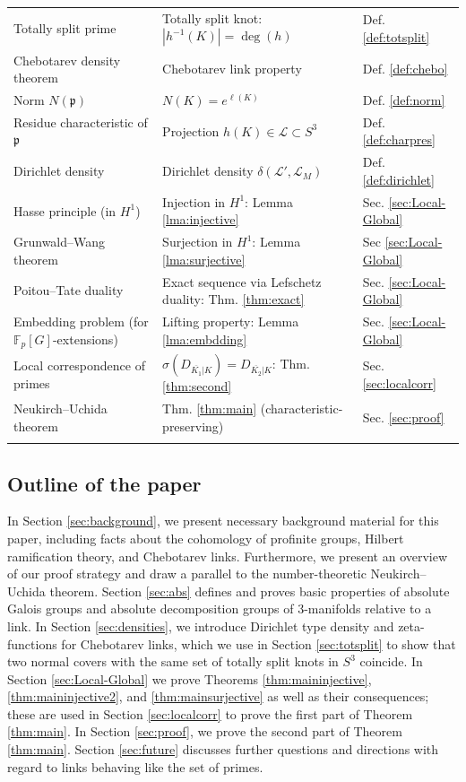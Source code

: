 \documentclass{amsart}
\theoremstyle{plain}
\theoremstyle{definition}
\theoremstyle{plain}
\theoremstyle{plain}
\theoremstyle{plain}
\theoremstyle{remark}
\theoremstyle{remark}
\theoremstyle{plain}
\theoremstyle{definition}
\theoremstyle{plain}
\newcounter{main}
\theoremstyle{plain}
\theoremstyle{plain}
\numberwithin{equation}{section}
\begin{document}
{\begin{longtable}{@{} l l l @{}}
\midrule
Totally split prime & Totally split knot: $|h^{-1}(K)| = \deg(h)$ & Def. \ref{def:totsplit} \\
Chebotarev density theorem & Chebotarev link property & Def. \ref{def:chebo} \\
Norm $N(\mathfrak{p})$ & $N(K) = e^{\ell(K)}$ & Def. \ref{def:norm} \\
Residue characteristic of $\mathfrak{p}$ & Projection $h(K) \in \mathcal{L} \subset S^3$ & Def. \ref{def:charpres} \\
Dirichlet density & Dirichlet density $\delta(\mathcal{L}', \mathcal{L}_M)$ & Def. \ref{def:dirichlet} \\
\midrule
Hasse principle (in $H^1$) & Injection in $H^1$: Lemma \ref{lma:injective} & Sec. \ref{sec:Local-Global} \\
Grunwald--Wang theorem & Surjection in $H^1$: Lemma \ref{lma:surjective} & Sec \ref{sec:Local-Global} \\
Poitou--Tate duality & Exact sequence via Lefschetz duality: Thm. \ref{thm:exact} & Sec. \ref{sec:Local-Global} \\
Embedding problem (for $\mathbb{F}_p[G]$-extensions) & Lifting property: Lemma \ref{lma:embdding} & Sec. \ref{sec:Local-Global} \\
Local correspondence of primes & $\sigma(D_{\overline{K_1}|K}) = D_{\overline{K_2}|K}$: Thm. \ref{thm:second} & Sec. \ref{sec:localcorr} \\
Neukirch--Uchida theorem & Thm. \ref{thm:main} (characteristic-preserving) & Sec. \ref{sec:proof} \\
\bottomrule
\label{tab:dictionary}
\end{longtable}
}

\subsection{Outline of the paper}

In Section \ref{sec:background}, we present necessary background material for this paper, including facts about the cohomology of profinite groups, Hilbert ramification theory, and Chebotarev links. Furthermore, we present an overview of our proof strategy and draw a parallel to the number-theoretic Neukirch--Uchida theorem. Section \ref{sec:abs} defines and proves basic properties of absolute Galois groups and absolute decomposition groups of 3-manifolds relative to a link. In Section \ref{sec:densities}, we introduce Dirichlet type density and zeta-functions for Chebotarev links, which we use in Section \ref{sec:totsplit} to show that two normal covers with the same set of totally split knots in $S^3$ coincide. In Section \ref{sec:Local-Global} we prove Theorems \ref{thm:maininjective}, \ref{thm:maininjective2}, and \ref{thm:mainsurjective} as well as their consequences; these are used in Section \ref{sec:localcorr} to prove the first part of Theorem \ref{thm:main}. In Section \ref{sec:proof}, we prove the second part of Theorem \ref{thm:main}. Section \ref{sec:future} discusses further questions and directions with regard to links behaving like the set of primes. 
\end{document}
